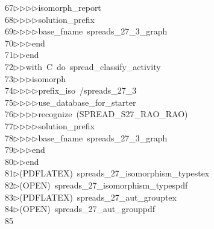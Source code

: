 \begin{tabbing}
67\>$\triangleright$\>$\triangleright$\>$\triangleright$\>$\triangleright$\>isomorph\_report\ \\[0pt]
68\>$\triangleright$\>$\triangleright$\>$\triangleright$\>$\triangleright$\>solution\_prefix\ \ \\[0pt]
69\>$\triangleright$\>$\triangleright$\>$\triangleright$\>$\triangleright$\>base\_fname\ spreads\_27\_3\_graph\ \\[0pt]
70\>$\triangleright$\>$\triangleright$\>$\triangleright$\>end\ \\[0pt]
71\>$\triangleright$\>$\triangleright$\>end\ \\[0pt]
72\>$\triangleright$\>$\triangleright$\>with\ C\ do\ spread\_classify\_activity\ \\[0pt]
73\>$\triangleright$\>$\triangleright$\>$\triangleright$\>isomorph\ \\[0pt]
74\>$\triangleright$\>$\triangleright$\>$\triangleright$\>$\triangleright$\>prefix\_iso\ /spreads\_27\_3\ \\[0pt]
75\>$\triangleright$\>$\triangleright$\>$\triangleright$\>$\triangleright$\>use\_database\_for\_starter\ \\[0pt]
76\>$\triangleright$\>$\triangleright$\>$\triangleright$\>$\triangleright$\>recognize\ (SPREAD\_S27\_RAO\_RAO)\ \\[0pt]
77\>$\triangleright$\>$\triangleright$\>$\triangleright$\>$\triangleright$\>solution\_prefix\ \ \\[0pt]
78\>$\triangleright$\>$\triangleright$\>$\triangleright$\>$\triangleright$\>base\_fname\ spreads\_27\_3\_graph\ \\[0pt]
79\>$\triangleright$\>$\triangleright$\>$\triangleright$\>end\ \\[0pt]
80\>$\triangleright$\>$\triangleright$\>end\\[0pt]
81\>$\triangleright$\>(PDFLATEX)\ spreads\_27\_isomorphism\_typestex\\[0pt]
82\>$\triangleright$\>(OPEN)\ spreads\_27\_isomorphism\_typespdf\\[0pt]
83\>$\triangleright$\>(PDFLATEX)\ spreads\_27\_aut\_grouptex\\[0pt]
84\>$\triangleright$\>(OPEN)\ spreads\_27\_aut\_grouppdf\\[0pt]
85\>\end{tabbing}
